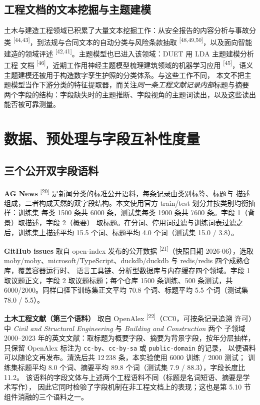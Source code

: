 \documentclass{article}
\begin{document}
\subsection{工程文档的文本挖掘与主题建模}

土木与建造工程领域已积累了大量文本挖掘工作：从安全报告的内容分析与事故分类
\textsuperscript{[44,43]}，到法规与合同文本的自动分类与风险条款抽取
\textsuperscript{[48,49,50]}，以及面向智能建造的领域评述
\textsuperscript{[42,41]}。主题模型也已进入该领域：DUET 用 LDA 主题建模分析工程
文档 \textsuperscript{[46]}，近期工作用神经主题模型梳理建筑领域的机器学习应用
\textsuperscript{[45]}，语义主题建模还被用于构造数字孪生护照的分类体系。与这些工作不同，
本文不把主题模型当作下游分类的特征提取器，而关注\emph{同一条工程文献记录内部}标题与摘要
两个字段的结构：字段缺失时的主题推断、字段视角的主题词读出，以及这些读出能否被可靠测量。

\section{数据、预处理与字段互补性度量}

\subsection{三个公开双字段语料}

\textbf{AG News} \textsuperscript{[20]} 是新闻分类的标准公开语料，每条记录由类别标签、标题与
描述组成，二者构成天然的双字段结构。本文使用官方 train/test 划分并按类别均衡抽样：训练集
每类 1500 条共 6000 条，测试集每类 1900 条共 7600 条。字段 1（背景）取描述，字段 2（概要）
取标题。在分词、停用词过滤与训练词表过滤之后，训练集上描述平均 15.5 个词、标题平均
4.0 个词（测试集 15.0 / 3.8）。

\textbf{GitHub issues} 取自 open-index 发布的公开数据 \textsuperscript{[21]}（快照日期 2026-06），选取
moby/moby、microsoft/TypeScript、duckdb/duckdb 与 redis/redis 四个成熟仓库，覆盖容器运行时、
语言工具链、分析型数据库与内存缓存四个领域。字段 1 取议题正文，字段 2 取议题标题；每个仓库
1500 条训练、500 条测试，共 6000/2000。同样口径下训练集正文平均 70.8 个词、标题平均
5.5 个词（测试集 78.0 / 5.5）。

\textbf{土木工程文献（第三个语料）} 取自 OpenAlex \textsuperscript{[22]}（CC0，可按条记录追溯
许可）中 \emph{Civil and Structural Engineering} 与 \emph{Building and Construction} 两个
子领域 2000--2023 年的英文文献：取标题为概要字段、摘要为背景字段，按年分层抽样，
只保留 OpenAlex 标注为 \texttt{cc-by}、\texttt{cc-by-sa} 或 \texttt{public-domain} 的记录，
以便语料可以随论文再发布。清洗后共 12\,238 条，本实验使用 6000 训练 / 2000 测试；
训练集标题平均 8.0 个词、摘要平均 89.8 个词（测试集 7.9 / 88.3），字段长度比 11.2。
该语料的字段文体与上述两个工程语料不同（标题是名词短语、摘要是学术写作），
因此它同时检验了字段机制在非工程文档上的表现；这也是第 5.10 节
组件消融的三个语料之一。
\end{document}
